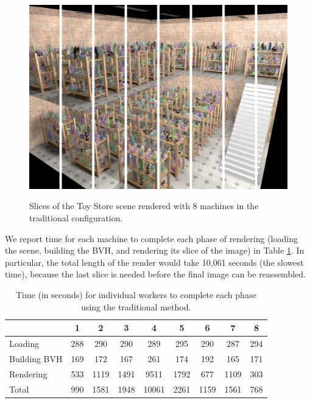 \documentclass[12pt]{ucthesis}
\newcommand{\captionfonts}{\small\bf\ssp}
\begin{document}
\begin{figure}[h!]
    \centering
    \includegraphics[width=120mm]{images/toystore-sliced.png}
    \captionfonts
    \caption{Slices of the Toy Store scene rendered with 8 machines in the traditional configuration.}
    \label{fig:toystoresliced}
\end{figure}

We report time for each machine to complete each phase of rendering (loading
the scene, building the BVH, and rendering its slice of the image) in Table
\ref{tb:traditionaltimes}. In particular, the total length of the render would
take 10,061 seconds (the slowest time), because the last slice is needed before
the final image can be reassembled.

\begin{table}
\begin{center}
\begin{tabular}{|l||c|c|c|c|c|c|c|c|}
    \hline
    & 1 & 2 & 3 & 4 & 5 & 6 & 7 & 8 \\
    \hline
    \hline
    Loading & 288 & 290 & 290 & 289 & 295 & 290 & 287 & 294 \\
    \hline
    Building BVH & 169 & 172 & 167 & 261 & 174 & 192 & 165 & 171 \\
    \hline
    Rendering & 533 & 1119 & 1491 & 9511 & 1792 & 677 & 1109 & 303 \\
    \hline
    \hline
    Total & 990 & 1581 & 1948 & 10061 & 2261 & 1159 & 1561 & 768 \\
    \hline
\end{tabular}
\caption{Time (in seconds) for individual workers to complete each phase using the traditional method.}
\label{tb:traditionaltimes}
\end{center}
\end{table}
\end{document}
